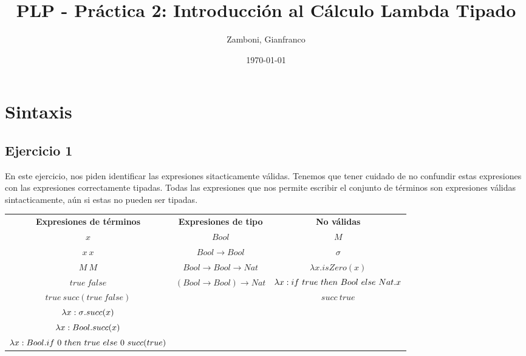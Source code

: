 \documentclass[10pt,a4paper, landscape]{article}
\begin{document}
\title{PLP - Práctica 2: Introducción al Cálculo Lambda Tipado}

\date{\today}

\author{Zamboni, Gianfranco}

\maketitle
\setcounter{page}{1}

\section*{Sintaxis}
\subsection{Ejercicio 1}
En este ejercicio, nos piden identificar las expresiones sitacticamente válidas. Tenemos que tener cuidado de no confundir estas expresiones con las expresiones correctamente tipadas. Todas las expresiones que nos permite escribir el conjunto de términos son expresiones válidas sintacticamente, aún si estas no pueden ser tipadas.

\vspace*{5mm}
\begin{center}
    \begin{tabular}{c|c|c}
        \textbf{Expresiones de términos} & \textbf{Expresiones de tipo} & \textbf{No válidas}\\
        
        $x$ & $Bool$ & $M$ \\ 
        $x~x$  &  $Bool\to Bool$  &  $\sigma$ \\
        $M~M$   & $Bool\to Bool\to Nat$ & $\lambda x.isZero(x)$ \\ 
        $true~false$ &  $(Bool\to Bool)\to Nat$ & $\lambda x:if~ true~ then~ Bool~ else~ Nat.x$ \\ 
        $true~succ(true~false)$     &   & $succ~true$ \\ 
        ${\lambda x: \sigma \text{.} succ(x)}$ &   & \\ 
        $\lambda x: Bool \text{.} succ(x)$     &  & \\ 
        $\lambda x: Bool \text{.} if~ 0~ then~ true~ else~ 0~succ(true)$ &  & \\ 
    \end{tabular}
\end{center}
\end{document}
